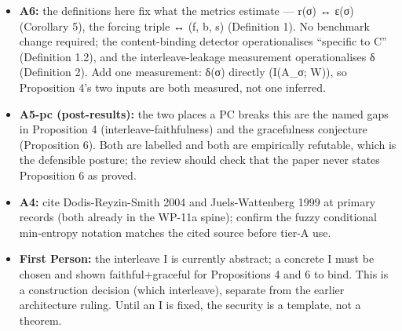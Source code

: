 \documentclass[
  11pt,
]{article}
\providecommand{\tightlist}{%
  \setlength{\itemsep}{0pt}\setlength{\parskip}{0pt}}
\begin{document}
\begin{itemize}
\tightlist
\item
  \textbf{A6:} the definitions here fix what the metrics estimate ---
  r(σ) ↔ ε(σ) (Corollary 5), the forcing triple ↔ (f, b, s) (Definition
  1). No benchmark change required; the content-binding detector
  operationalises ``specific to C'' (Definition 1.2), and the
  interleave-leakage measurement operationalises δ (Definition 2). Add
  one measurement: δ(σ) directly (I(A\_σ; W)), so Proposition 4's two
  inputs are both measured, not one inferred.
\item
  \textbf{A5-pc (post-results):} the two places a PC breaks this are the
  named gaps in Proposition 4 (interleave-faithfulness) and the
  gracefulness conjecture (Proposition 6). Both are labelled and both
  are empirically refutable, which is the defensible posture; the review
  should check that the paper never states Proposition 6 as proved.
\item
  \textbf{A4:} cite Dodis-Reyzin-Smith 2004 and Juels-Wattenberg 1999 at
  primary records (both already in the WP-11a spine); confirm the fuzzy
  conditional min-entropy notation matches the cited source before
  tier-A use.
\item
  \textbf{First Person:} the interleave I is currently abstract; a
  concrete I must be chosen and shown faithful+graceful for Propositions
  4 and 6 to bind. This is a construction decision (which interleave),
  separate from the earlier architecture ruling. Until an I is fixed,
  the security is a template, not a theorem.
\end{itemize}
\end{document}
